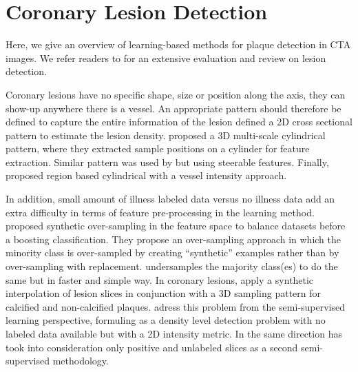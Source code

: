 \section{Coronary Lesion Detection}

Here, we give an overview of learning-based methods for plaque detection in CTA images. We refer readers to  \citep{Kirisli2013} for an extensive evaluation and review on lesion detection.

Coronary lesions have no specific shape, size or position along the axis, they can show-up anywhere there is a vessel. An appropriate pattern should therefore be defined to capture the entire information of the lesion \citep{Zuluaga2011c} defined a 2D cross sectional pattern to estimate the lesion density. \citep{Tessmann2009} proposed a 3D multi-scale cylindrical pattern, where they extracted sample positions on a cylinder for feature extraction. Similar pattern was used by \citep{Mittal2010} but using steerable features. Finally, \citep{Cetin2012} proposed region based cylindrical with a vessel intensity approach.

In addition, small amount of illness labeled data versus no illness data add an extra difficulty in terms of feature pre-processing in the learning method.\citep{Chawla2002} proposed synthetic over-sampling in the feature space to balance datasets before a boosting classification. They propose an over-sampling approach in which the minority class is over-sampled by creating “synthetic” examples rather than by over-sampling with replacement. \citep{Seiffert2010} undersamples the majority class(es) to do the same but in faster and simple way.
In coronary lesions, \citep{Mittal2010} apply a synthetic interpolation of lesion slices in conjunction with a 3D sampling pattern for  calcified and non-calcified plaques. \citep{Zuluaga2011Thesis} adress this problem from the semi-supervised learning perspective, formuling as a density level detection problem with no labeled data available but with a 2D intensity metric. In the same direction \citep{Zuluaga2011a} has took into consideration only positive and unlabeled slices as a second semi-supervised methodology.
